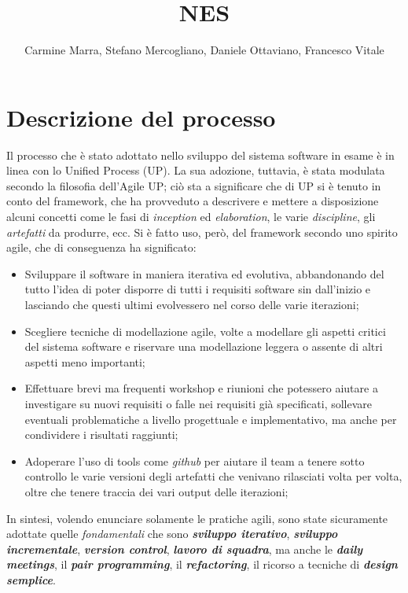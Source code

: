 \documentclass[11pt]{article}
\begin{document}
\title{NES}
\author{Carmine Marra, Stefano Mercogliano, Daniele Ottaviano, Francesco Vitale}
\date{}
\maketitle
\tableofcontents
\clearpage

\section{Descrizione del processo}
Il processo che è stato adottato nello sviluppo del sistema software in esame è in linea con lo Unified Process (UP). La sua adozione, tuttavia, è stata modulata secondo la filosofia dell'Agile UP; ciò sta a significare che di UP si è tenuto in conto del framework, che ha provveduto a descrivere e mettere a disposizione alcuni concetti come le fasi di \emph{inception} ed \emph{elaboration}, le varie \emph{discipline}, gli \emph{artefatti} da produrre, ecc. Si è fatto uso, però, del framework secondo uno spirito agile, che di conseguenza ha significato:
\begin{itemize}
	\item{
		 Sviluppare il software in maniera iterativa ed evolutiva, abbandonando del tutto l'idea di poter disporre di tutti i requisiti software sin dall'inizio e lasciando che questi ultimi evolvessero nel corso delle varie iterazioni;
	}
	\item{
		Scegliere tecniche di modellazione agile, volte a modellare gli aspetti critici del sistema software e riservare una modellazione leggera o assente di altri aspetti meno importanti;
	}
	\item{
		Effettuare brevi ma frequenti workshop e riunioni che potessero aiutare a investigare su nuovi requisiti o falle nei requisiti già specificati, sollevare eventuali problematiche
		a livello progettuale e implementativo, ma anche per condividere i risultati raggiunti;
	}
	\item{
		Adoperare l'uso di tools come \emph{github} per aiutare il team a tenere sotto controllo le varie versioni degli artefatti che venivano rilasciati volta per volta, oltre che
		tenere traccia dei vari output delle iterazioni;
	}
\end{itemize}
In sintesi, volendo enunciare solamente le pratiche agili, sono state sicuramente adottate quelle \emph{fondamentali} che sono \emph{\textbf{sviluppo iterativo}},  \emph{\textbf{sviluppo incrementale}},  \emph{\textbf{version control}}, \emph{\textbf{lavoro di squadra}}, ma anche le \emph{\textbf{daily meetings}}, il \emph{\textbf{pair programming}}, il \emph{\textbf{refactoring}}, il ricorso a tecniche di \emph{\textbf{design semplice}}. 
\end{document}
